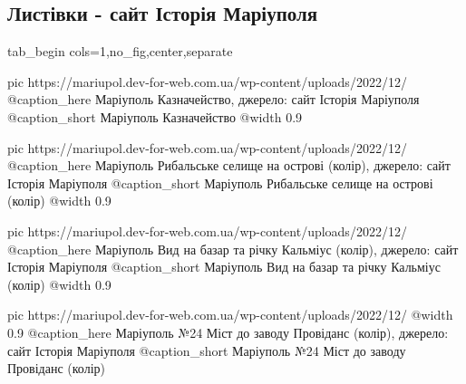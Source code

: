  
 
 
 
 

\subsection{Листівки - сайт Історія Маріуполя}

\ifcmt
  tab_begin cols=1,no_fig,center,separate

  pic https://mariupol.dev-for-web.com.ua/wp-content/uploads/2022/12/%
  @caption_here Маріуполь Казначейство, джерело: сайт Історія Маріуполя
  @caption_short Маріуполь Казначейство
  @width 0.9

  pic https://mariupol.dev-for-web.com.ua/wp-content/uploads/2022/12/%
  @caption_here Маріуполь Рибальське селище на острові (колір), джерело: сайт Історія Маріуполя
  @caption_short Маріуполь Рибальське селище на острові (колір)
  @width 0.9

  pic https://mariupol.dev-for-web.com.ua/wp-content/uploads/2022/12/%
  @caption_here Маріуполь Вид на базар та річку Кальміус (колір), джерело: сайт Історія Маріуполя
  @caption_short Маріуполь Вид на базар та річку Кальміус (колір)
  @width 0.9

  pic https://mariupol.dev-for-web.com.ua/wp-content/uploads/2022/12/%
  @width 0.9
  @caption_here Маріуполь №24 Міст до заводу Провіданс (колір), джерело: сайт Історія Маріуполя
  @caption_short Маріуполь №24 Міст до заводу Провіданс (колір)

